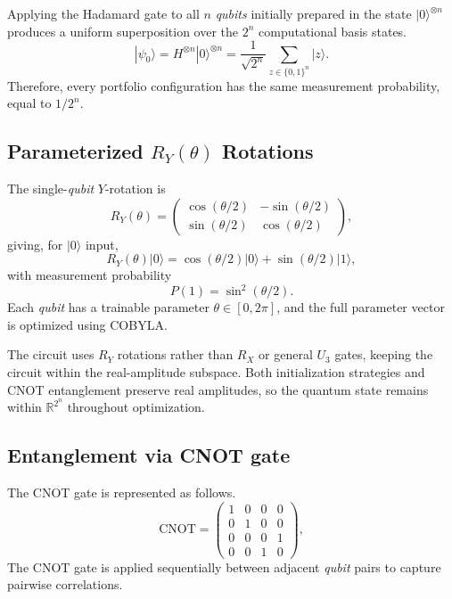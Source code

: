 \documentclass[runningheads]{llncs}
\begin{document}
Applying the Hadamard gate to all $n$ \emph{qubits} initially prepared in the state $|0\rangle^{\otimes n}$ produces a uniform superposition over the $2^n$ computational basis states.
\begin{equation}
    |\psi_0\rangle =
    H^{\otimes n}|0\rangle^{\otimes n}
    =
    \frac{1}{\sqrt{2^n}}
    \sum_{z \in \{0,1\}^n}|z\rangle.
\end{equation}
Therefore, every portfolio configuration has the same measurement probability, equal to $1/2^n$.
\subsection{Parameterized $R_Y(\theta)$ Rotations}
The single-\emph{qubit} $Y$-rotation is
\begin{equation}
    R_Y(\theta) = \begin{pmatrix} 
        \cos(\theta/2) & -\sin(\theta/2) \\ 
        \sin(\theta/2) &  \cos(\theta/2) 
    \end{pmatrix},
\end{equation}
giving, for $|0\rangle$ input,
\begin{equation}
    R_Y(\theta)|0\rangle = \cos(\theta/2)|0\rangle 
    + \sin(\theta/2)|1\rangle,
\end{equation}
with measurement probability
\begin{equation}
    P(1) = \sin^2(\theta/2).
\end{equation}
Each \emph{qubit} has a trainable parameter $\theta\in[0,2\pi]$, and the full parameter vector is optimized using COBYLA.

The circuit uses $R_Y$ rotations rather than $R_X$ or general $U_3$ gates, keeping the circuit within the real-amplitude subspace. Both initialization strategies and CNOT entanglement preserve real amplitudes, so the quantum state remains within $\mathbb{R}^{2^n}$ throughout optimization.

\subsection{Entanglement via CNOT gate}
The CNOT gate is represented as follows.
\begin{equation}
    \text{CNOT} = \begin{pmatrix} 
        1 & 0 & 0 & 0 \\ 
        0 & 1 & 0 & 0 \\ 
        0 & 0 & 0 & 1 \\ 
        0 & 0 & 1 & 0 
    \end{pmatrix},
\end{equation}
The CNOT gate is applied sequentially between adjacent \emph{qubit} pairs to capture pairwise correlations.
\end{document}
